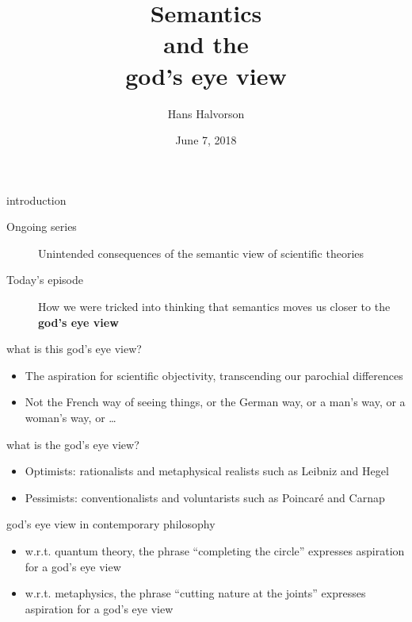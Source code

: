 \documentclass[17pt]{beamer}
\title{Semantics \\ and the \\ god's eye view}
\author{Hans Halvorson}
\date{June 7, 2018}
\begin{document}
\def\2{\mathcal}
\def\7{\mathfrak}

\begin{frame}

\maketitle  %

\end{frame}

\begin{frame}{\small introduction}

  \begin{description}
    \item[Ongoing series] Unintended consequences of the semantic view of
      scientific theories
    \item [Today's episode] How we were tricked into thinking that
      semantics moves us closer to the \textbf{god's eye
        view} \end{description}


\end{frame}


\begin{frame}{\small what is this god's eye view?}

\begin{itemize}
\item The aspiration for scientific objectivity, transcending our
  parochial differences
\item Not the French way of seeing things, or the German way, or a
  man's way, or a woman's way, or \dots
\end{itemize}

\end{frame}



\begin{frame}{\small what is the god's eye view?}

\begin{itemize}  
\item Optimists: rationalists and metaphysical realists
  such as Leibniz and Hegel
\item Pessimists: conventionalists and voluntarists such as Poincar\'e
  and Carnap
\end{itemize}


\end{frame}

\begin{frame}{\small god's eye view in contemporary philosophy}

\begin{itemize}
\item w.r.t. quantum theory, the phrase ``completing the circle''
  expresses aspiration for a god's eye view
\item w.r.t. metaphysics, the phrase ``cutting nature at the joints''
  expresses aspiration for a god's eye view
\end{itemize}


\end{frame}
\end{document}
